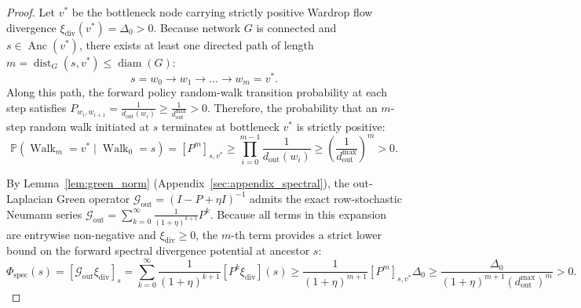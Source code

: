 \documentclass[11pt,a4paper]{article}
\begin{document}
\begin{proof}
Let $v^*$ be the bottleneck node carrying strictly positive Wardrop flow divergence $\xi_{\text{div}}(v^*) = \Delta_0 > 0$. Because network $G$ is connected and $s \in \operatorname{Anc}(v^*)$, there exists at least one directed path of length $m = \operatorname{dist}_G(s, v^*) \le \operatorname{diam}(G)$:
\begin{equation}
s = w_0 \to w_1 \to \dots \to w_m = v^*.
\end{equation}
Along this path, the forward policy random-walk transition probability at each step satisfies $P_{w_i, w_{i+1}} = \frac{1}{d_{\text{out}}(w_i)} \ge \frac{1}{d_{\text{out}}^{\max}} > 0$. Therefore, the probability that an $m$-step random walk initiated at $s$ terminates at bottleneck $v^*$ is strictly positive:
\begin{equation}
\label{eq:random_walk_path_bound}
\mathbb{P}(\operatorname{Walk}_m = v^* \mid \operatorname{Walk}_0 = s) = [P^m]_{s, v^*} \ge \prod_{i=0}^{m-1} \frac{1}{d_{\text{out}}(w_i)} \ge \left( \frac{1}{d_{\text{out}}^{\max}} \right)^m > 0.
\end{equation}

By Lemma~\ref{lem:green_norm} (Appendix~\ref{sec:appendix_spectral}), the out-Laplacian Green operator $\mathcal{G}_{\text{out}} = (I - P + \eta I)^{-1}$ admits the exact row-stochastic Neumann series $\mathcal{G}_{\text{out}} = \sum_{k=0}^\infty \frac{1}{(1+\eta)^{k+1}} P^k$. Because all terms in this expansion are entrywise non-negative and $\xi_{\text{div}} \ge 0$, the $m$-th term provides a strict lower bound on the forward spectral divergence potential at ancestor $s$:
\begin{equation}
\label{eq:phi_spec_strictly_positive}
\Phi_{\text{spec}}(s) = [\mathcal{G}_{\text{out}} \xi_{\text{div}}]_s = \sum_{k=0}^\infty \frac{1}{(1+\eta)^{k+1}} [P^k \xi_{\text{div}}](s) \ge \frac{1}{(1+\eta)^{m+1}} [P^m]_{s, v^*} \Delta_0 \ge \frac{\Delta_0}{(1+\eta)^{m+1} (d_{\text{out}}^{\max})^m} > 0.
\end{equation}


\end{proof}
\end{document}
